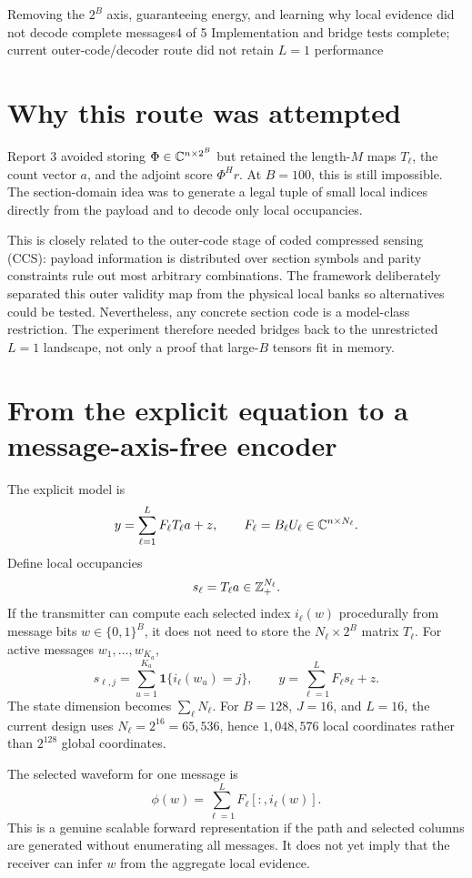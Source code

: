 \documentclass[11pt]{article}
\begin{document}
{Removing the $2^B$ axis, guaranteeing energy, and learning why local evidence did not decode complete messages}{4 of 5}
{Implementation and bridge tests complete; current outer-code/decoder route did not retain $L=1$ performance}

\section{Why this route was attempted}

Report 3 avoided storing $\Phi\in\mathbb{C}^{n\times2^B}$ but retained the length-$M$ maps $T_\ell$, the count vector $a$, and
the adjoint score $\Phi^Hr$. At $B=100$, this is still impossible. The section-domain idea was to generate a legal tuple
of small local indices directly from the payload and to decode only local occupancies.

This is closely related to the outer-code stage of coded compressed sensing (CCS): payload information is distributed
over section symbols and parity constraints rule out most arbitrary combinations. The framework deliberately separated
this outer validity map from the physical local banks so alternatives could be tested. Nevertheless, any concrete
section code is a model-class restriction. The experiment therefore needed bridges back to the unrestricted $L=1$
landscape, not only a proof that large-$B$ tensors fit in memory.

\section{From the explicit equation to a message-axis-free encoder}

The explicit model is
\[
 y=\sum_{\ell=1}^LF_\ell T_\ell a+z,
 \qquad F_\ell=B_\ell U_\ell\in\mathbb{C}^{n\times N_\ell}.
\]
Define local occupancies
\[
 s_\ell=T_\ell a\in\mathbb{Z}_+^{N_\ell}.
\]
If the transmitter can compute each selected index $i_\ell(w)$ procedurally from message bits
$w\in\{0,1\}^B$, it does not need to store the $N_\ell\times2^B$ matrix $T_\ell$. For active messages
$w_1,\ldots,w_{K_a}$,
\[
 s_{\ell,j}=\sum_{u=1}^{K_a}\mathbf 1\{i_\ell(w_u)=j\},
 \qquad
 y=\sum_{\ell=1}^LF_\ell s_\ell+z.
\]
The state dimension becomes $\sum_\ell N_\ell$. For $B=128$, $J=16$, and $L=16$, the current design uses
$N_\ell=2^{16}=65{,}536$, hence $1{,}048{,}576$ local coordinates rather than $2^{128}$ global coordinates.

The selected waveform for one message is
\[
 \phi(w)=\sum_{\ell=1}^LF_\ell[:,i_\ell(w)].
\]
This is a genuine scalable forward representation if the path and selected columns are generated without enumerating
all messages. It does not yet imply that the receiver can infer $w$ from the aggregate local evidence.
\end{document}

